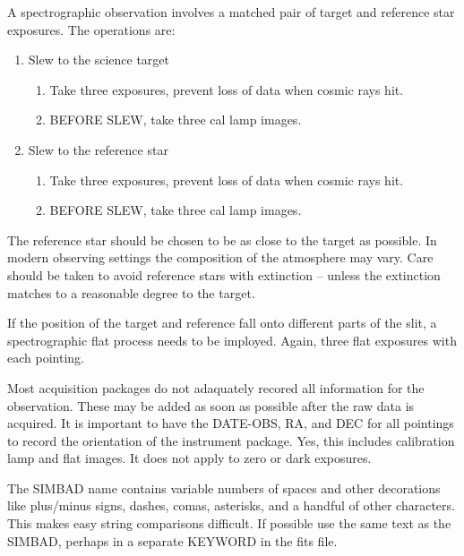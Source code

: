 A spectrographic observation involves a matched pair of target and reference star
exposures. The operations are:
\vspace{-.15cm}
\begin{enumerate}\addtolength{\itemsep}{-0.5\baselineskip}
   \item   Slew to the science target
\vspace{-.15cm}
\begin{enumerate}\addtolength{\itemsep}{-0.5\baselineskip}
   \item   Take three exposures, prevent loss of data when cosmic rays hit.
   \item   BEFORE SLEW, take three cal lamp images. 
\end{enumerate}

   \item   Slew to the reference star
\vspace{-.15cm}
\begin{enumerate}\addtolength{\itemsep}{-0.5\baselineskip}
   \item   Take three exposures, prevent loss of data when cosmic rays hit.
   \item   BEFORE SLEW, take three cal lamp images. 
\end{enumerate}
\end{enumerate}

The reference star should be chosen to be as close to the target as possible. In
modern observing settings the composition of the atmosphere may vary. Care should
be taken to avoid reference stars with extinction -- unless the extinction matches
to a reasonable degree to the target.

If the position of the target and reference fall onto different parts of the slit,
a spectrographic flat process needs to be imployed. Again, three flat exposures
with each pointing.

Most acquisition packages do not adaquately recored all information for the observation.
These may be added as soon as possible after the raw data is acquired. It is important
to have the DATE-OBS, RA, and DEC for all pointings to record the orientation of
the instrument package. Yes, this includes calibration lamp and flat images. It does
not apply to zero or dark exposures.

The SIMBAD name  contains variable numbers of spaces and other
decorations like plus/minus signs, dashes, comas, asterisks, and a handful of other
characters. This makes easy string comparisons difficult. If possible use the same
text as the SIMBAD, perhaps in a separate KEYWORD in the fits file.

